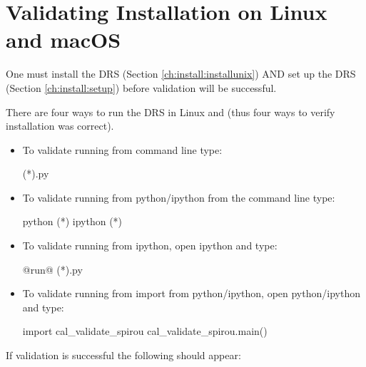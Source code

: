 \clearpage
\newpage
\section{Validating Installation on Linux and macOS}
\label{ch:install:validating_installunix}

\begin{note}
One must install the DRS (Section \ref{ch:install:installunix}) AND set up the DRS (Section \ref{ch:install:setup}) before validation will be successful.
\end{note}

\noindent There are four ways to run the DRS in Linux and \mac (thus four ways to verify installation was correct).

\begin{itemize}

\item To validate running from command line type:
\begin{cmdbox}
(*\calvalidate*).py
\end{cmdbox}

\item To validate running from python/ipython from the command line type:
\begin{cmdbox}
python (*\calvalidate*)
ipython (*\calvalidate*)
\end{cmdbox}

\item To validate running from ipython, open ipython and type:
\begin{pythonbox}
@run@ (*\calvalidate*).py
\end{pythonbox}

\item To validate running from import from python/ipython, open python/ipython and type:
\begin{pythonbox}
import cal_validate_spirou
cal_validate_spirou.main()
\end{pythonbox}

\end{itemize}

\noindent If validation is successful the following should appear:

